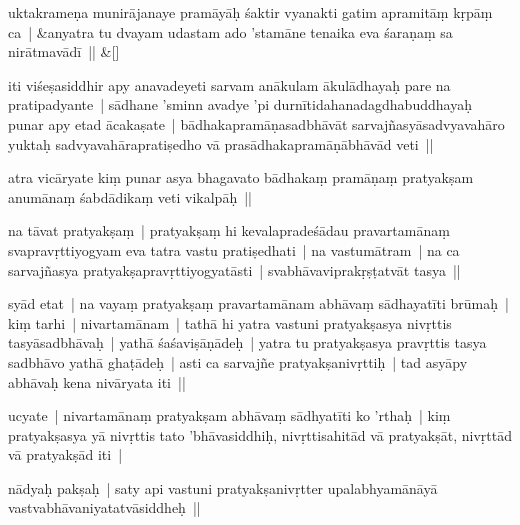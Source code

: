 \documentclass[article,12pt,a4paper]{memoir}%
\newcounter{parCount}
\begin{document}
	    
	    \stanza[\smallbreak]
	  uktakrameṇa munirājanaye pramāyāḥ śaktir vyanakti gatim apramitāṃ kṛpāṃ ca | &anyatra tu dvayam udastam ado 'stamāne tenaika eva śaraṇaṃ sa nirātmavādī || \&[\smallbreak]
	  
	  
	  

	  \pstart \leavevmode%
	iti viśeṣasiddhir apy anavadeyeti sarvam anākulam ākulādhayaḥ pare na pratipadyante | sādhane 'sminn avadye 'pi durnītidahanadagdhabuddhayaḥ punar apy etad ācakaṣate | bādhakapramāṇasadbhāvāt sarvajñasyāsadvyavahāro yuktaḥ sadvyavahārapratiṣedho vā prasādhakapramāṇābhāvād veti || 
	{}
	\pend%
      

	  \pstart \leavevmode%
	\label{thakur75-6.25}atra vicāryate kiṃ punar asya bhagavato bādhakaṃ pramāṇaṃ pratyakṣam anumānaṃ śabdādikaṃ veti vikalpāḥ || 
	{}
	\pend%
      

	  \pstart \leavevmode%
	\label{thakur75-6.27}na tāvat pratyakṣaṃ | pratyakṣaṃ hi kevalapradeśādau pravartamānaṃ svapravṛttiyogyam eva tatra vastu pratiṣedhati | na vastumātram | na ca sarvajñasya pratyakṣapravṛttiyogyatāsti | svabhāvaviprakṛṣṭatvāt tasya || 
	{}
	\pend%
      

	  \pstart \leavevmode%
	\label{thakur75-7.1}syād etat | na vayaṃ pratyakṣaṃ pravartamānam abhāvaṃ sādhayatīti brūmaḥ | kiṃ tarhi | nivartamānam | tathā hi yatra vastuni pratyakṣasya nivṛttis tasyāsadbhāvaḥ | yathā śaśaviṣāṇādeḥ | yatra tu pratyakṣasya pravṛttis tasya sadbhāvo yathā ghaṭādeḥ | asti ca sarvajñe pratyakṣanivṛttiḥ | tad asyāpy abhāvaḥ kena nivāryata iti || 
	{}
	\pend%
      

	  \pstart \leavevmode%
	\label{thakur75-7.5}ucyate | nivartamānaṃ pratyakṣam abhāvaṃ sādhyatīti ko 'rthaḥ | kiṃ pratyakṣasya yā nivṛttis tato 'bhāvasiddhiḥ, nivṛttisahitād vā pratyakṣāt, nivṛttād vā pratyakṣād iti | 
	{}
	\pend%
      

	  \pstart \leavevmode%
	\label{thakur75-7.7}nādyaḥ pakṣaḥ | saty api vastuni pratyakṣanivṛtter upalabhyamānāyā vastvabhāvaniyatatvāsiddheḥ || 
	{}
	\pend%
      
\end{document}
